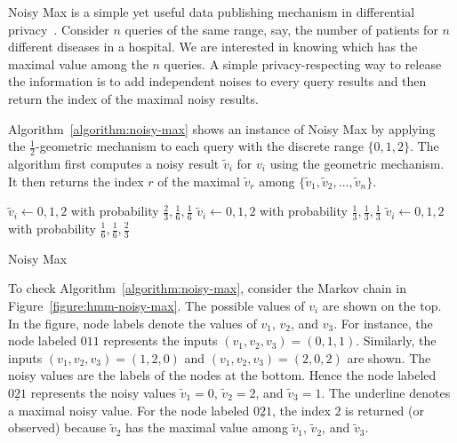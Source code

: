 
Noisy Max is a simple yet useful data publishing mechanism in
differential privacy~\cite{DR:14:AFDP,DWWZK:18:DVDP}. Consider $n$
queries of the same range, say, the number of patients for $n$
different diseases in a hospital. We are interested in knowing which
has the maximal value among the $n$ queries. A simple
privacy-respecting way to release the information is to add
independent noises to every query results and then return the index of
the maximal noisy results.

Algorithm~\ref{algorithm:noisy-max} shows an instance of Noisy Max by
applying the $\frac{1}{2}$-geometric mechanism to each query with
the discrete range $\{ 0, 1, 2 \}$. The algorithm first computes
a noisy result $\tilde{v}_i$ for $v_i$ using the geometric
mechanism. It then returns the index $r$ of the maximal
$\tilde{v}_r$ among $\{ \tilde{v}_1, \tilde{v}_2, \ldots, \tilde{v}_n
\}$.


\begin{algorithm}
  \begin{algorithmic}[1]
                {$\tilde{v}_i \leftarrow 0, 1, 2$ with probability
                 $\frac{2}{3}, \frac{1}{6}, \frac{1}{6}$}
                {$\tilde{v}_i \leftarrow 0, 1, 2$ with probability
                 $\frac{1}{3}, \frac{1}{3}, \frac{1}{3}$}
                {$\tilde{v}_i \leftarrow 0, 1, 2$ with probability
                 $\frac{1}{6}, \frac{1}{6}, \frac{2}{3}$}
        \EndMatch
      \EndFor
    \EndFunction
  \end{algorithmic}
  \caption{Noisy Max}
  \label{algorithm:noisy-max}
\end{algorithm}

To check Algorithm~\ref{algorithm:noisy-max}, consider the Markov
chain in Figure~\ref{figure:hmm-noisy-max}. The possible values of
$v_i$ are shown on the top. In the figure, node labels denote the
values of $v_1$, $v_2$, and $v_3$. For instance, the node labeled
$011$ represents the inputs $(v_1, v_2, v_3) = (0, 1, 1)$. Similarly,
the inputs $(v_1, v_2, v_3) = (1, 2, 0)$ and $(v_1, v_2, v_3) = (2, 0,
2)$ are shown.
The noisy values are the labels of the nodes at the bottom.
Hence the node labeled $0\underline{2}1$ represents the noisy values
$\tilde{v}_1 = 0$,
$\tilde{v}_2 = 2$, and $\tilde{v}_3 = 1$. The underline denotes a
maximal noisy value. For the node labeled $0\underline{2}1$, the index
$2$ is returned (or observed) because $\tilde{v}_2$ has the maximal
value among $\tilde{v}_1$, $\tilde{v}_2$, and $\tilde{v}_3$.


